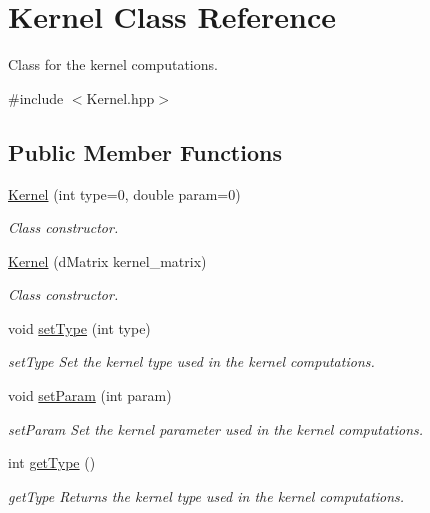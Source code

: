 \hypertarget{class_kernel}{}\section{Kernel Class Reference}
\label{class_kernel}


Class for the kernel computations.  




{\ttfamily \#include $<$Kernel.\+hpp$>$}

\subsection*{Public Member Functions}
\begin{DoxyCompactItemize}
\item 
\mbox{\label{class_kernel_ae60e072c58cdc16842a239bdd0761590}} 
\hyperlink{class_kernel_ae60e072c58cdc16842a239bdd0761590}{Kernel} (int type=0, double param=0)
\begin{DoxyCompactList}\small\item\em Class constructor. \end{DoxyCompactList}\item 
\hyperlink{class_kernel_adf23c1567adb8ddb5757931587320871}{Kernel} (d\+Matrix kernel\+\_\+matrix)
\begin{DoxyCompactList}\small\item\em Class constructor. \end{DoxyCompactList}\item 
void \hyperlink{class_kernel_ad01e209470accf44ea240078f39fb127}{set\+Type} (int type)
\begin{DoxyCompactList}\small\item\em set\+Type Set the kernel type used in the kernel computations. \end{DoxyCompactList}\item 
void \hyperlink{class_kernel_a4fe711ebdbc168be1733fbb8aea6cf92}{set\+Param} (int param)
\begin{DoxyCompactList}\small\item\em set\+Param Set the kernel parameter used in the kernel computations. \end{DoxyCompactList}\item 
int \hyperlink{class_kernel_a5a2cb0fce0eda6c67a2325f6c8958da8}{get\+Type} ()
\begin{DoxyCompactList}\small\item\em get\+Type Returns the kernel type used in the kernel computations. \end{DoxyCompactList}\item 

\end{DoxyCompactItemize}
